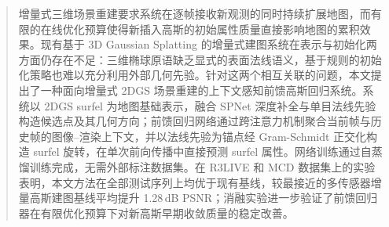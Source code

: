 
\begin{abstract}

增量式三维场景重建要求系统在逐帧接收新观测的同时持续扩展地图，而有限的在线优化预算使得新插入高斯的初始属性质量直接影响地图的累积效果。现有基于 3D Gaussian Splatting 的增量式建图系统在表示与初始化两方面仍存在不足：三维椭球原语缺乏显式的表面法线语义，基于规则的初始化策略也难以充分利用外部几何先验。针对这两个相互关联的问题，本文提出了一种面向增量式 2DGS 场景重建的上下文感知前馈高斯回归系统。系统以 2DGS surfel 为地图基础表示，融合 SPNet 深度补全与单目法线先验构造候选点及其几何方向；前馈回归网络通过跨注意力机制聚合当前帧与历史帧的图像--渲染上下文，并以法线先验为锚点经 Gram-Schmidt 正交化构造 surfel 旋转，在单次前向传播中直接预测 surfel 属性。网络训练通过自蒸馏训练完成，无需外部标注数据集。在 R3LIVE 和 MCD 数据集上的实验表明，本文方法在全部测试序列上均优于现有基线，较最接近的多传感器增量高斯建图基线平均提升 1.28\,dB PSNR；消融实验进一步验证了前馈回归器在有限优化预算下对新高斯早期收敛质量的稳定改善。

\end{abstract}
